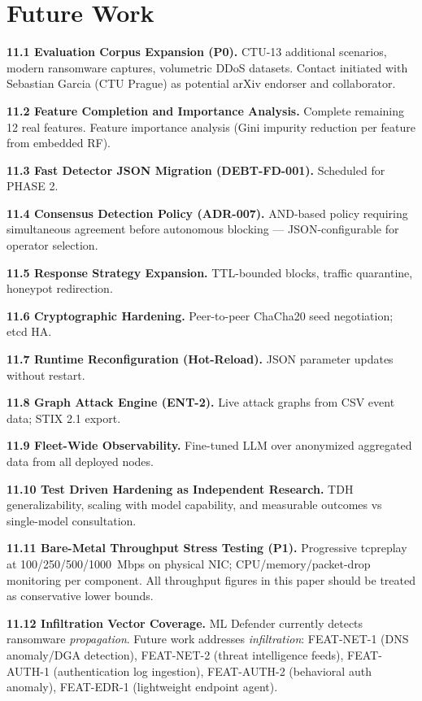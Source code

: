 \documentclass[11pt,a4paper]{article}
\begin{document}
\section{Future Work}
\label{sec:future}

\textbf{11.1 Evaluation Corpus Expansion (P0).}
\label{sec:future:corpus}
CTU-13 additional scenarios, modern ransomware captures, volumetric DDoS datasets. Contact
initiated with Sebastian Garcia (CTU Prague) as potential arXiv endorser and collaborator.

\textbf{11.2 Feature Completion and Importance Analysis.}
Complete remaining 12 real features. Feature importance analysis (Gini impurity reduction
per feature from embedded RF).

\textbf{11.3 Fast Detector JSON Migration (DEBT-FD-001).} Scheduled for PHASE 2.

\textbf{11.4 Consensus Detection Policy (ADR-007).}
\label{sec:future:consensus}
AND-based policy requiring simultaneous agreement before autonomous blocking ---
JSON-configurable for operator selection.

\textbf{11.5 Response Strategy Expansion.}
\label{sec:future:response}
TTL-bounded blocks, traffic quarantine, honeypot redirection.

\textbf{11.6 Cryptographic Hardening.} Peer-to-peer ChaCha20 seed negotiation; etcd HA.

\textbf{11.7 Runtime Reconfiguration (Hot-Reload).} JSON parameter updates without restart.

\textbf{11.8 Graph Attack Engine (ENT-2).} Live attack graphs from CSV event data; STIX 2.1
export.

\textbf{11.9 Fleet-Wide Observability.} Fine-tuned LLM over anonymized aggregated data from
all deployed nodes.

\textbf{11.10 Test Driven Hardening as Independent Research.} TDH generalizability, scaling
with model capability, and measurable outcomes vs single-model consultation.

\textbf{11.11 Bare-Metal Throughput Stress Testing (P1).}
\label{sec:future:baremetal}
Progressive tcpreplay at 100/250/500/1000~Mbps on physical NIC; CPU/memory/packet-drop
monitoring per component. All throughput figures in this paper should be treated as
conservative lower bounds.

\textbf{11.12 Infiltration Vector Coverage.}
ML Defender currently detects ransomware \emph{propagation}. Future work addresses
\emph{infiltration}: FEAT-NET-1 (DNS anomaly/DGA detection), FEAT-NET-2 (threat intelligence
feeds), FEAT-AUTH-1 (authentication log ingestion), FEAT-AUTH-2 (behavioral auth anomaly),
FEAT-EDR-1 (lightweight endpoint agent).
\end{document}
